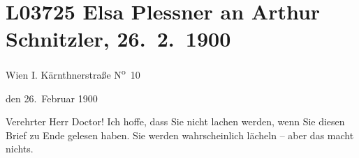 

\section[Elsa Plessner an Arthur Schnitzler, 26. 2. 1900]{L03725 Elsa Plessner an Arthur Schnitzler, 26. 2. 1900}
\nopagebreak{}
\rehead{ }\normalsize\beginnumbering{}
\toendnotes[C]{\smallbreak\pagebreak[2]}
\toendnotes[C]{\smallbreak}
\pstart
           {\pb}Wien I. Kärnthnerstraße N\textsuperscript{o} 10\pend
           
\pstart
           \raggedleft{}den 26. Februar 1900\pend
           
\pstart{}Verehrter Herr Doctor!\pend\vspace{0.5em}
\pstart
           Ich hoffe, dass Sie nicht lachen werden, wenn Sie diesen Brief zu Ende gelesen haben.
               Sie werden wahrscheinlich lächeln – aber das macht nichts. \pend
           
